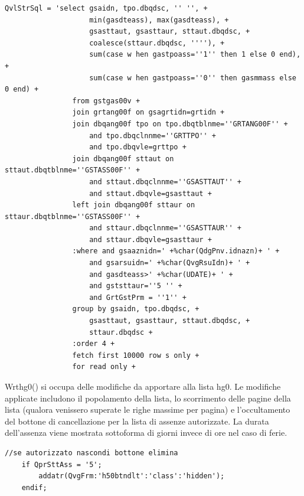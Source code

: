 \documentclass[target=bach,aauheader=,style=]{thud}
\begin{document}
\begin{lstlisting}[language=RPG, caption=Codice RPG per la costruzione dell'interrogazione SQL]
    QvlStrSql = 'select gsaidn, tpo.dbqdsc, '' '', +
                    min(gasdteass), max(gasdteass), +
                    gsasttaut, gsasttaur, sttaut.dbqdsc, +
                    coalesce(sttaur.dbqdsc, ''''), +
                    sum(case w hen gastpoass=''1'' then 1 else 0 end), +
                    sum(case w hen gastpoass=''0'' then gasmmass else 0 end) +
                from gstgas00v +
                join grtang00f on gsagrtidn=grtidn +
                join dbqang00f tpo on tpo.dbqtblnme=''GRTANG00F'' +
                    and tpo.dbqclnnme=''GRTTPO'' +
                    and tpo.dbqvle=grttpo +
                join dbqang00f sttaut on sttaut.dbqtblnme=''GSTASS00F'' +
                    and sttaut.dbqclnnme=''GSASTTAUT'' +
                    and sttaut.dbqvle=gsasttaut +
                left join dbqang00f sttaur on sttaur.dbqtblnme=''GSTASS00F'' +
                    and sttaur.dbqclnnme=''GSASTTAUR'' +
                    and sttaur.dbqvle=gsasttaur +
                :where and gsaaznidn=' +%char(QdgPnv.idnazn)+ ' +
                    and gsarsuidn=' +%char(QvgRsuIdn)+ ' +
                    and gasdteass>' +%char(UDATE)+ ' +
                    and gststtaur=''5 '' +
                    and GrtGstPrm = ''1'' +
                group by gsaidn, tpo.dbqdsc, +
                    gsasttaut, gsasttaur, sttaut.dbqdsc, +
                    sttaur.dbqdsc +
                :order 4 +
                fetch first 10000 row s only +
                for read only +
\end{lstlisting}

\break

Wrthg0() si occupa delle modifiche da apportare alla lista hg0.
Le modifiche applicate includono il popolamento della lista, lo scorrimento delle pagine della lista (qualora venissero superate le righe massime per pagina) 
e l'occultamento del bottone di cancellazione per la lista di assenze autorizzate.
La durata dell'assenza viene mostrata sottoforma di giorni invece di ore nel caso di ferie.

\begin{lstlisting}[language=RPG, caption=Codice RPG di occultamento del bottone elimina(h50btndlt), label=lst:rpglodhf0gsa081]
    //se autorizzato nascondi bottone elimina
    if QprSttAss = '5';
        addatr(QvgFrm:'h50btndlt':'class':'hidden');
    endif; 
\end{lstlisting}
\end{document}

